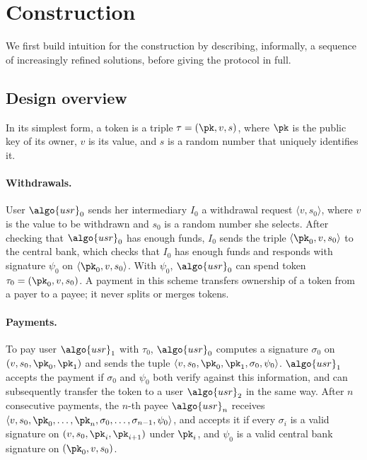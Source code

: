 \section{Construction}\label{sec:offline-construction}

We first build intuition for the construction by describing, informally, a
sequence of increasingly refined solutions, before giving the protocol in full.

\subsection{Design overview}

In its simplest form, a token is a triple $\tau = (\pk, v, s)$, where $\pk$ is
the public key of its owner, $v$ is its value, and $s$ is a random number that
uniquely identifies it.

\paragraph{Withdrawals.} User $\algo{usr}_0$ sends her intermediary $I_0$ a
withdrawal request $\langle v, s_0 \rangle$, where $v$ is the value to be
withdrawn and $s_0$ is a random number she selects. After checking that
$\algo{usr}_0$ has enough funds, $I_0$ sends the triple $\langle \pk_0, v, s_0
\rangle$ to the central bank, which checks that $I_0$ has enough funds and
responds with signature $\psi_0$ on $\langle \pk_0, v, s_0 \rangle$. With
$\psi_0$, $\algo{usr}_0$ can spend token $\tau_0 = (\pk_0, v, s_0)$. A payment
in this scheme transfers ownership of a token from a payer to a payee; it never
splits or merges tokens.

\paragraph{Payments.} To pay user $\algo{usr}_1$ with $\tau_0$, $\algo{usr}_0$
computes a signature $\sigma_0$ on $(v, s_0, \pk_0, \pk_1)$ and sends the tuple
$\langle v, s_0, \pk_0, \pk_1, \sigma_0, \psi_0 \rangle$. $\algo{usr}_1$
accepts the payment if $\sigma_0$ and $\psi_0$ both verify against this
information, and can subsequently transfer the token to a user $\algo{usr}_2$
in the same way.  After $n$ consecutive payments, the $n$-th payee
$\algo{usr}_n$ receives $\langle v, s_0, \pk_0, \ldots, \pk_n, \sigma_0,
\ldots, \sigma_{n-1}, \psi_0 \rangle$, and accepts it if every $\sigma_i$ is a
valid signature on $(v, s_0, \pk_i, \pk_{i+1})$ under $\pk_i$, and $\psi_0$ is
a valid central bank signature on $(\pk_0, v, s_0)$.

